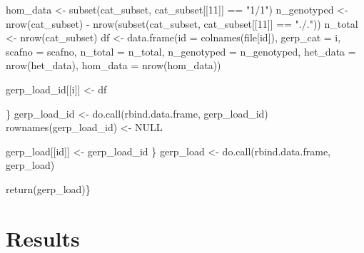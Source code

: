 \documentclass[
  letterpaper,
  DIV=11,
  numbers=noendperiod]{scrreprt}
\newenvironment{Shaded}{}{}
\newcommand{\AttributeTok}[1]{\textcolor[rgb]{0.84,0.23,0.29}{#1}}
\newcommand{\ConstantTok}[1]{\textcolor[rgb]{0.00,0.36,0.77}{#1}}
\newcommand{\DecValTok}[1]{\textcolor[rgb]{0.00,0.36,0.77}{#1}}
\newcommand{\FunctionTok}[1]{\textcolor[rgb]{0.44,0.26,0.76}{#1}}
\newcommand{\NormalTok}[1]{\textcolor[rgb]{0.14,0.16,0.18}{#1}}
\newcommand{\OtherTok}[1]{\textcolor[rgb]{0.44,0.26,0.76}{#1}}
\newcommand{\SpecialCharTok}[1]{\textcolor[rgb]{0.00,0.36,0.77}{#1}}
\newcommand{\StringTok}[1]{\textcolor[rgb]{0.01,0.18,0.38}{#1}}
\begin{document}
\begin{Shaded}
\begin{Highlighting}[]
\NormalTok{        hom\_data }\OtherTok{\textless{}{-}} \FunctionTok{subset}\NormalTok{(cat\_subset, cat\_subset[[}\DecValTok{11}\NormalTok{]] }\SpecialCharTok{==} \StringTok{"1/1"}\NormalTok{)}
\NormalTok{        n\_genotyped }\OtherTok{\textless{}{-}} \FunctionTok{nrow}\NormalTok{(cat\_subset) }\SpecialCharTok{{-}} \FunctionTok{nrow}\NormalTok{(}\FunctionTok{subset}\NormalTok{(cat\_subset, cat\_subset[[}\DecValTok{11}\NormalTok{]] }\SpecialCharTok{==} \StringTok{"./."}\NormalTok{))}
\NormalTok{        n\_total }\OtherTok{\textless{}{-}} \FunctionTok{nrow}\NormalTok{(cat\_subset)}
\NormalTok{        df }\OtherTok{\textless{}{-}} \FunctionTok{data.frame}\NormalTok{(}\AttributeTok{id =} \FunctionTok{colnames}\NormalTok{(file[id]),}
                         \AttributeTok{gerp\_cat =}\NormalTok{ i,}
                         \AttributeTok{scafno =}\NormalTok{ scafno,}
                         \AttributeTok{n\_total =}\NormalTok{ n\_total,}
                         \AttributeTok{n\_genotyped =}\NormalTok{ n\_genotyped,}
                         \AttributeTok{het\_data =} \FunctionTok{nrow}\NormalTok{(het\_data),}
                         \AttributeTok{hom\_data =} \FunctionTok{nrow}\NormalTok{(hom\_data))}
        
\NormalTok{        gerp\_load\_id[[i]] }\OtherTok{\textless{}{-}}\NormalTok{ df}
        
\NormalTok{        \}}
\NormalTok{        gerp\_load\_id }\OtherTok{\textless{}{-}} \FunctionTok{do.call}\NormalTok{(rbind.data.frame, gerp\_load\_id)}
        \FunctionTok{rownames}\NormalTok{(gerp\_load\_id) }\OtherTok{\textless{}{-}} \ConstantTok{NULL}
    
\NormalTok{    gerp\_load[[id]] }\OtherTok{\textless{}{-}}\NormalTok{ gerp\_load\_id}
\NormalTok{    \}}
\NormalTok{  gerp\_load }\OtherTok{\textless{}{-}} \FunctionTok{do.call}\NormalTok{(rbind.data.frame, gerp\_load)}

    \FunctionTok{return}\NormalTok{(gerp\_load)\}}
\end{Highlighting}
\end{Shaded}

\section{Results}\label{results-1}
\end{document}
